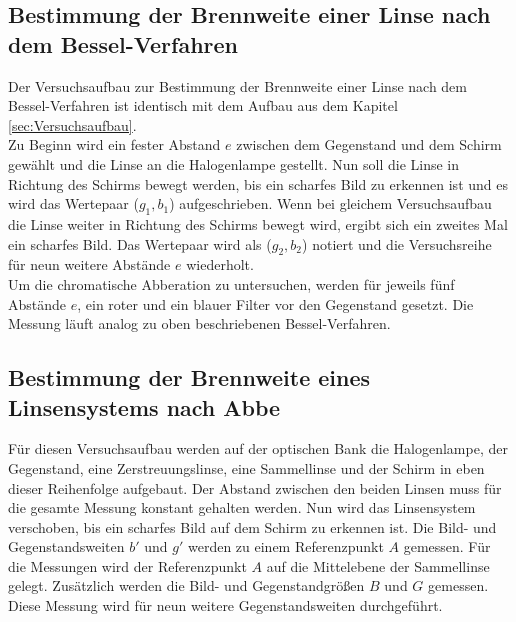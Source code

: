 \subsection{Bestimmung der Brennweite einer Linse nach dem Bessel-Verfahren}
Der Versuchsaufbau zur Bestimmung der Brennweite einer Linse nach dem Bessel-Verfahren ist identisch mit dem Aufbau aus dem Kapitel \eqref{sec:Versuchsaufbau}. \\
Zu Beginn wird ein fester Abstand $e$ zwischen dem Gegenstand und dem Schirm gewählt und die Linse an die Halogenlampe gestellt. Nun soll die Linse in Richtung des Schirms bewegt werden, bis ein scharfes Bild zu erkennen ist und es wird das Wertepaar ($g_1, b_1$) aufgeschrieben. Wenn bei gleichem Versuchsaufbau die Linse weiter in Richtung des Schirms bewegt wird, ergibt sich ein zweites Mal ein scharfes Bild. Das Wertepaar wird als ($g_2, b_2$) notiert und die Versuchsreihe für neun weitere Abstände $e$ wiederholt. \\
Um die chromatische Abberation zu untersuchen, werden für jeweils fünf Abstände $e$, ein roter und ein blauer Filter vor den Gegenstand gesetzt. Die Messung läuft analog zu oben beschriebenen Bessel-Verfahren.

\subsection{Bestimmung der Brennweite eines Linsensystems nach Abbe}
Für diesen Versuchsaufbau werden auf der optischen Bank die Halogenlampe, der Gegenstand, eine Zerstreuungslinse, eine Sammellinse und der Schirm in eben dieser Reihenfolge aufgebaut. Der Abstand zwischen den beiden Linsen muss für die gesamte Messung konstant gehalten werden. Nun wird das Linsensystem verschoben, bis ein scharfes Bild auf dem Schirm zu erkennen ist. Die Bild- und Gegenstandsweiten $b'$ und $g'$ werden zu einem Referenzpunkt $A$ gemessen. Für die Messungen wird der Referenzpunkt $A$ auf die Mittelebene der Sammellinse gelegt. Zusätzlich werden die Bild- und Gegenstandgrößen $B$ und $G$ gemessen. Diese Messung wird für neun weitere Gegenstandsweiten durchgeführt.

